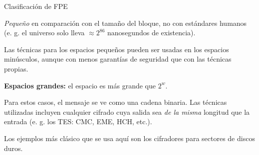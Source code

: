 \begin{frame}{Clasificación de FPE}
  {
    \textit{Pequeño} en comparación con el tamaño del bloque, no con
    estándares humanos (e. g. el universo solo lleva $ \approx 2^{86}$
    nanosegundos de existencia).

    Las técnicas para los espacios pequeños pueden ser usadas en los
    espacios minúsculos, aunque con menos garantías de seguridad que con
    las técnicas propias.
  }

  {
    \textbf{Espacios grandes:} el espacio es más grande que $ 2^w $.

    Para estos casos, el mensaje se ve como una cadena binaria. Las técnicas
    utilizadas incluyen cualquier cifrado cuya salida sea \textit{de la misma}
    longitud que la entrada (e. g. los TES: CMC, EME, HCH, etc.).
  }

  {
    Los ejemplos más clásico que se usa aquí son los cifradores para sectores
    de discos duros.
  }

\end{frame}
